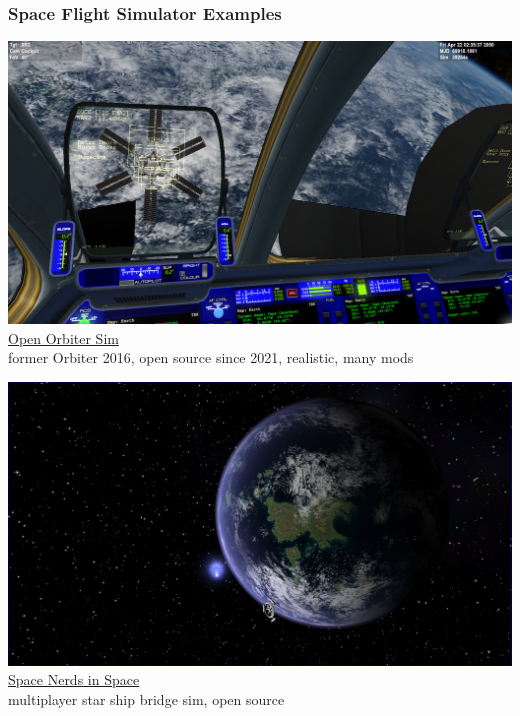 \documentclass[aspectratio=169,11pt,xcolor=dvipsnames]{beamer}
\begin{document}
\begin{frame}
  \frametitle{Space Flight Simulator Examples}
  \begin{minipage}[t]{0.49\textwidth}
    \begin{center}
      \includegraphics[width=\textwidth]{orbiter}\\
      \href{https://openorbiter.space/}{Open Orbiter Sim}\\
      former Orbiter 2016, open source since 2021, realistic, many mods
    \end{center}
  \end{minipage}
  \begin{minipage}[t]{0.49\textwidth}
    \begin{center}
      \includegraphics[width=\textwidth]{nerds}\\
      \href{https://smcameron.github.io/space-nerds-in-space/}{Space Nerds in Space}\\
      multiplayer star ship bridge sim, open source
    \end{center}
  \end{minipage}
\end{frame}
\end{document}
